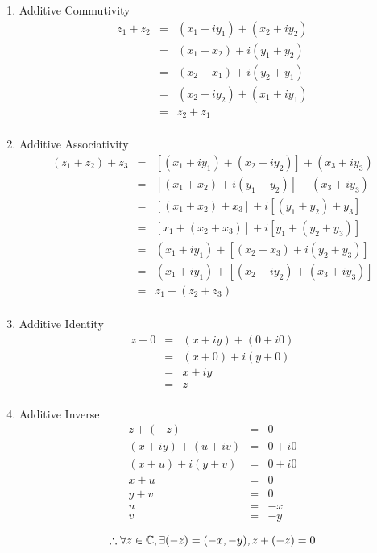 \documentclass[letterpaper,12pt,fleqn]{article}
\begin{document}
\begin{theproof}
\listbreak
\begin{enumerate}
\item Additive Commutivity
\begin{eqnarray*}
z_1+z_2 &=& (x_1+iy_1)+(x_2+iy_2) \\
    &=& (x_1+x_2)+i(y_1+y_2) \\
    &=& (x_2+x_1)+i(y_2+y_1) \\
    &=& (x_2+iy_2)+(x_1+iy_1) \\
    &=& z_2+z_1 \\
\end{eqnarray*}

\item Additive Associativity
\begin{eqnarray*}
(z_1+z_2)+z_3 &=& [(x_1+iy_1)+(x_2+iy_2)]+(x_3+iy_3) \\
    &=& [(x_1+x_2)+i(y_1+y_2)]+(x_3+iy_3) \\
    &=& [(x_1+x_2)+x_3]+i[(y_1+y_2)+y_3] \\
    &=& [x_1+(x_2+x_3)]+i[y_1+(y_2+y_3)] \\
    &=& (x_1+iy_1)+[(x_2+x_3)+i(y_2+y_3)] \\
    &=& (x_1+iy_1)+[(x_2+iy_2)+(x_3+iy_3)] \\
    &=& z_1+(z_2+z_3) \\
\end{eqnarray*}

\item Additive Identity
\begin{eqnarray*}
z+0 &=& (x+iy)+(0+i0) \\
    &=& (x+0)+i(y+0) \\
    &=& x+iy \\
    &=& z \\
\end{eqnarray*}

\item Additive Inverse
\begin{eqnarray*}
z+(-z) &=& 0 \\
(x+iy)+(u+iv) &=& 0+i0 \\
(x+u)+i(y+v) &=& 0+i0 \\
x+u &=& 0 \\
y+v &=& 0 \\
u &=& -x \\
v &=& -y \\
\end{eqnarray*}
\[\therefore\forall z\in\mathbb{C},\exists(-z)=(-x,-y),z+(-z)=0\]


\end{enumerate}
\end{theproof}
\end{document}
